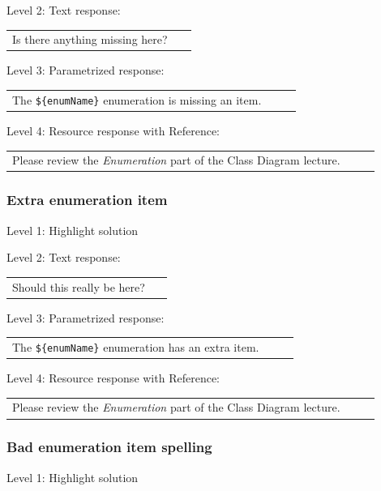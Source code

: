 \noindent Level 2: Text response: \medskip

\begin{tabular}{|p{0.9\linewidth}}
Is there anything missing here?
\end{tabular} \medskip

\noindent Level 3: Parametrized response: \medskip

\begin{tabular}{|p{0.9\linewidth}}
The \verb|${enumName}| enumeration is missing an item.
\end{tabular} \medskip

\noindent Level 4: Resource response with Reference: \medskip

\begin{tabular}{|p{0.9\linewidth}}
Please review the \textit{Enumeration} part of the Class Diagram lecture.
\end{tabular} \medskip


\subsubsection{Extra enumeration item}

\noindent Level 1: Highlight solution \medskip

\noindent Level 2: Text response: \medskip

\begin{tabular}{|p{0.9\linewidth}}
Should this really be here?
\end{tabular} \medskip

\noindent Level 3: Parametrized response: \medskip

\begin{tabular}{|p{0.9\linewidth}}
The \verb|${enumName}| enumeration has an extra item.
\end{tabular} \medskip

\noindent Level 4: Resource response with Reference: \medskip

\begin{tabular}{|p{0.9\linewidth}}
Please review the \textit{Enumeration} part of the Class Diagram lecture.
\end{tabular} \medskip


\subsubsection{Bad enumeration item spelling}

\noindent Level 1: Highlight solution \medskip

